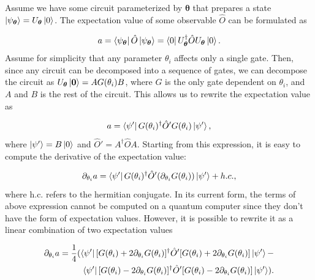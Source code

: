 Assume we have some circuit parameterized by $\boldsymbol{\theta}$ that prepares a state $\ket{\psi_{\boldsymbol{\theta}}} = U_{\boldsymbol{\theta}}\ket{0}$. The expectation value of some observable $\hat{O}$ can be formulated as 

\begin{equation}
    a = \bra{\psi_{\boldsymbol{\theta}}} \hat{O} \ket{\psi_{\boldsymbol{\theta}}} = \bra{0}U_{\boldsymbol{\theta}}^{\dagger}\hat{O}U_{\boldsymbol{\theta}}\ket{0}.
\end{equation}
Assume for simplicity that any parameter $\theta_i$ affects only a single gate. Then, since any circuit can be decomposed into a sequence of gates, we can decompose the circuit as $U_{\boldsymbol{\theta}}\ket{\boldsymbol{0}} = AG(\theta_i)B$, where $G$ is the only gate dependent on $\theta_i$, and $A$ and $B$ is the rest of the circuit. This allows us to rewrite the expectation value as 

\begin{equation}
    a = \bra{\psi'} G(\theta_i)^{\dagger} \hat{O}' G(\theta_i) \ket{\psi'},
\end{equation}
where $\ket{\psi'} = B\ket{0}$ and $\hat{O}' = A^{\dagger}\hat{O}A$. Starting from this expression, it is easy to compute the derivative of the expectation value:

\begin{equation}
    \partial_{\theta_i} a = \bra{\psi'} G(\theta_i)^{\dagger} \hat{O}' (\partial_{\theta_i}G(\theta_i)) \ket{\psi'} + h.c.,
\end{equation}
where h.c. refers to the hermitian conjugate. In its current form, the terms of above expression cannot be computed on a quantum computer since they don't have the form of expectation values. However, it is possible to rewrite it as a linear combination of two expectation values

\begin{equation}\label{eq:generalDeriv}
\begin{aligned}
    \partial_{\theta_i} a = 
    \frac{1}{4}(
    \bra{\psi'} [G(\theta_i)+2\partial_{\theta_i}G(\theta_i)]^{\dagger} \hat{O}' [G(\theta_i)+2\partial_{\theta_i}G(\theta_i)] \ket{\psi'} -\\
    \bra{\psi'} [G(\theta_i)-2\partial_{\theta_i}G(\theta_i)]^{\dagger} \hat{O}' [G(\theta_i)-2\partial_{\theta_i}G(\theta_i)] \ket{\psi'}).
\end{aligned}
\end{equation}

